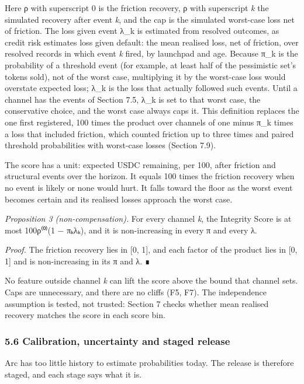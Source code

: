Here ρ with superscript 0 is the friction recovery, ρ with superscript \emph{k} the simulated recovery after event \emph{k}, and the cap is the simulated worst-case loss net of friction. The loss given event λ\_k is estimated from resolved outcomes, as credit risk estimates loss given default: the mean realised loss, net of friction, over resolved records in which event \emph{k} fired, by launchpad and age. Because π\_k is the probability of a threshold event (for example, at least half of the pessimistic set's tokens sold), not of the worst case, multiplying it by the worst-case loss would overstate expected loss; λ\_k is the loss that actually followed such events. Until a channel has the events of Section 7.5, λ\_k is set to that worst case, the conservative choice, and the worst case always caps it. This definition replaces the one first registered, 100 times the product over channels of one minus π\_k times a loss that included friction, which counted friction up to three times and paired threshold probabilities with worst-case losses (Section 7.9).

The score has a unit: expected USDC remaining, per 100, after friction and structural events over the horizon. It equals 100 times the friction recovery when no event is likely or none would hurt. It falls toward the floor as the worst event becomes certain and its realised losses approach the worst case.

\emph{Proposition 3 (non-compensation).} For every channel \emph{k}, the Integrity Score is at most 100ρ⁽⁰⁾(1 − πₖλₖ), and it is non-increasing in every π and every λ.

\emph{Proof.} The friction recovery lies in {[}0, 1{]}, and each factor of the product lies in {[}0, 1{]} and is non-increasing in its π and λ. ∎

No feature outside channel \emph{k} can lift the score above the bound that channel sets. Caps are unnecessary, and there are no cliffs (F5, F7). The independence assumption is tested, not trusted: Section 7 checks whether mean realised recovery matches the score in each score bin.

\subsubsection{5.6 Calibration, uncertainty and staged release}\label{calibration-uncertainty-and-staged-release}

Arc has too little history to estimate probabilities today. The release is therefore staged, and each stage says what it is.

